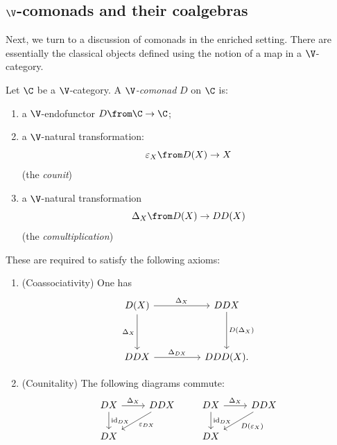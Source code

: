 \documentclass{tac}
\def\id{\operatorname{id}}
\begin{document}
\subsection{$\V$-comonads and their coalgebras}
\label{def:enrichedcomonad}
Next, we turn to a discussion of comonads in the enriched setting. There are essentially the classical objects defined using the notion of a map in a $\V$-category.
\begin{definition}
Let $\C$ be a $\V$-category. A \emph{$\V$-comonad} $D$ on $\C$ is: 
\begin{enumerate}
    \item a $\V$-endofunctor $D \from \C \to \C$;
    \item a $\V$-natural transformation:
    $$
        \varepsilon_X \from D(X) \to  X
    $$
    (the \emph{counit})
    
    \item a $\V$-natural transformation 
    $$
       \Delta_X \from D(X) \to DD(X)
    $$
    (the \emph{comultiplication})
\end{enumerate}
These are required to satisfy the following axioms:
\begin{enumerate}
    \item  (Coassociativity) One has
    $$
    \begin{tikzcd}
D(X) \arrow[dd, "\Delta_{X}"'] \arrow[rr, "\Delta_{X}"] &  & DDX \arrow[dd, "D(\Delta_X)"] \\
                                                                                                                       &  &                                                                                         \\
DDX \arrow[rr, "\Delta_{DX}"]                                             &  & DDD(X).                                                         
\end{tikzcd}
$$
\item 
(Counitality)
The following diagrams commute: 
$$
\begin{tikzcd}
    DX \dar{\id_{DX}} \rar{\Delta_X}& DDX \arrow[dl, "\varepsilon_{DX}"]
    \\
    DX
\end{tikzcd}
\qquad
\begin{tikzcd}
    DX \dar{\id_{DX}} \rar{\Delta_X}& DDX \arrow[dl, "D(\varepsilon_{X})"]
    \\
    DX
\end{tikzcd}
$$
\end{enumerate}
\end{definition}
\end{document}
